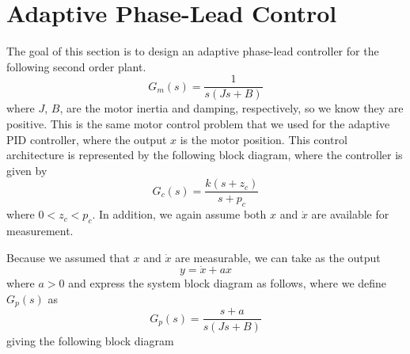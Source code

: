 \section{Adaptive Phase-Lead Control}

The goal of this section is to design an adaptive phase-lead controller for the following second order plant.
\begin{equation*}
  G_{m}(s)=\frac{1}{s(Js+B)}
\end{equation*}
where $J$, $B$, are the motor inertia and damping, respectively, so we know they are positive.
This is the same motor control problem that we used for the adaptive PID controller, where the output $x$ is the motor position.
This control architecture is represented by the following block diagram, where the controller is given by
\begin{equation*}
  G_{c}(s)=\frac{k(s+z_{c})}{s+p_{c}}
\end{equation*}
where $0<z_{c}<p_{c}$.
In addition, we again assume both $x$ and $\dot{x}$ are available for measurement.

\begin{figure}[H]
  \begin{center}
  \end{center}
\end{figure}

Because we assumed that $x$ and $\dot{x}$ are measurable, we can take as the output
\begin{equation*}
  y=\dot{x}+ax
\end{equation*}
where $a>0$ and express the system block diagram as follows, where we define $G_{p}(s)$ as
\begin{equation*}
  G_{p}(s)=\frac{s+a}{s(Js+B)}
\end{equation*}
giving the following block diagram


